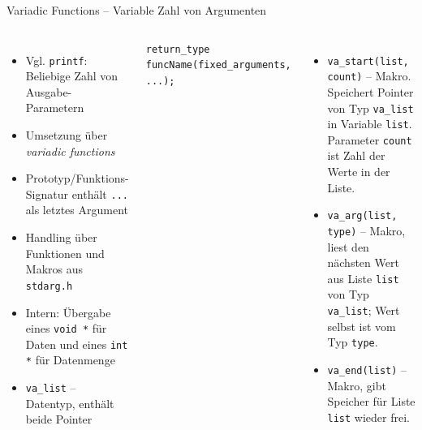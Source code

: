 
\begin{frame}[t,plain]
\titlepage
\end{frame}


\begin{frame}[fragile]{Variadic Functions -- Variable Zahl von Argumenten}
%
\begin{columns}[T]
\begin{itemize}
\item Vgl. \texttt{printf}: Beliebige Zahl von Ausgabe-Parametern
\item Umsetzung über \emph{variadic functions}
\item Prototyp/Funktions-Signatur enthält \texttt{...} als letztes Argument
\item Handling über Funktionen und Makros aus \texttt{stdarg.h}
\item Intern: Übergabe eines \texttt{void *} für Daten und eines \texttt{int *} für Datenmenge
\item \texttt{va\_list} -- Datentyp, enthält beide Pointer
\end{itemize}
%
\begin{codebox}
\begin{verbatim}
return_type funcName(fixed_arguments, ...);
\end{verbatim}
\end{codebox}
%
\begin{itemize}
\item \texttt{va\_start(list, count)} -- Makro. Speichert Pointer von Typ \texttt{va\_list} in Variable \texttt{list}. Parameter \texttt{count} ist Zahl der Werte in der Liste.
\item \texttt{va\_arg(list, type)}  -- Makro, liest den nächsten Wert aus Liste \texttt{list} von Typ \texttt{va\_list}; Wert selbst ist vom Typ \texttt{type}.
\item \texttt{va\_end(list)} -- Makro, gibt Speicher für Liste \texttt{list} wieder frei.
\end{itemize}
\end{columns}
%
\end{frame}



